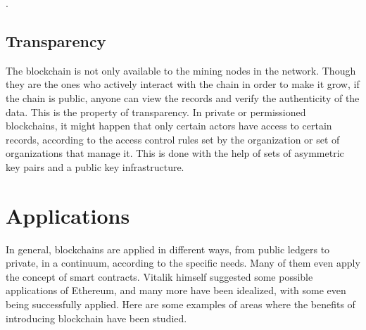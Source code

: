 

 .
    
    \subsection{Transparency}
   The blockchain is not only available to the mining nodes in the network. Though they are the ones who actively interact with the chain in order to make it grow, if the chain is public, anyone can view the records and verify the authenticity of the data. This is the property of transparency. In private or permissioned blockchains, it might happen that only certain actors have access to certain records, according to the access control rules set by the organization or set of organizations that manage it. This is done with the help of sets of asymmetric key pairs and a public key infrastructure.
    



\section{Applications}

    In general, blockchains are applied in different ways, from public ledgers to private, in a continuum, according to the specific needs. Many of them even apply the concept of smart contracts. Vitalik himself suggested some possible applications of Ethereum, and many more have been idealized, with some even being successfully applied. Here are some examples of areas where the benefits of introducing blockchain have been studied.
    

